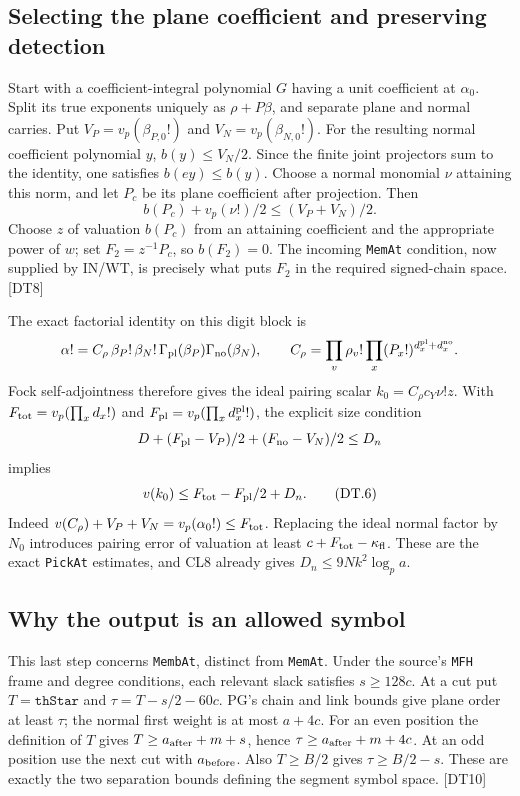 \documentclass[11pt,a4paper]{article}
\numberwithin{equation}{section}
\theoremstyle{remark}\newtheorem{remark}[theorem]{Remark}
\begin{document}
\subsection{Selecting the plane coefficient and preserving detection}

Start with a coefficient-integral polynomial $G$ having a unit coefficient at $\alpha_0$. Split its true exponents uniquely as $\rho+P\beta$, and separate plane and normal carries. Put
$V_P=v_p(\beta_{P,0}!)$ and $V_N=v_p(\beta_{N,0}!)$.
For the resulting normal coefficient polynomial $y$, $b(y)\le V_N/2$.
Since the finite joint projectors sum to the identity, one satisfies $b(ey)\le b(y)$.
Choose a normal monomial $\nu$ attaining this norm, and let $P_c$ be its plane coefficient after projection. Then
\[
 b(P_c)+v_p(\nu!)/2\le(V_P+V_N)/2.
\]
Choose $z$ of valuation $b(P_c)$ from an attaining coefficient and the appropriate power of $w$; set $F_2=z^{-1}P_c$, so $b(F_2)=0$.
The incoming \texttt{MemAt} condition, now supplied by IN/WT, is precisely what puts $F_2$ in the required signed-chain space. \textsf{[DT8]}

The exact factorial identity on this digit block is
\[
 \alpha!=C_\rho\,\beta_P!\,\beta_N!\,
       \Gamma_{\rm pl}(\beta_P)\Gamma_{\rm no}(\beta_N),\qquad
 C_\rho=\prod_v\rho_v!\prod_x(P_x!)^{d_x^{\rm pl}+d_x^{\rm no}}.
\]
Fock self-adjointness therefore gives the ideal pairing scalar
$k_0=C_\rho c_Y\nu!z$. With $F_{\rm tot}=v_p(\prod_xd_x!)$ and
$F_{\rm pl}=v_p(\prod_xd_x^{\rm pl}!)$, the explicit size condition
\[
 D+(F_{\rm pl}-V_P)/2+(F_{\rm no}-V_N)/2\le D_n
\]
implies
\[
 v(k_0)\le F_{\rm tot}-F_{\rm pl}/2+D_n.
 \tag{DT.6}
\]
Indeed $v(C_\rho)+V_P+V_N=v_p(\alpha_0!)\le F_{\rm tot}$. Replacing the ideal normal factor by $N_0$ introduces pairing error of valuation at least $c+F_{\rm tot}-\kappa_{\rm fl}$. These are the exact \texttt{PickAt} estimates, and CL8 already gives $D_n\le9Nk^2\log_p a$.

\subsection{Why the output is an allowed symbol}

This last step concerns \texttt{MembAt}, distinct from \texttt{MemAt}. Under the source's \texttt{MFH} frame and degree conditions, each relevant slack satisfies $s\ge128c$.
At a cut put $T=\texttt{thStar}$ and $\tau=T-s/2-60c$.
PG's chain and link bounds give plane order at least $\tau$; the normal first weight is at most $a+4c$.
For an even position the definition of $T$ gives $T\ge a_{\rm after}+m+s$, hence $\tau\ge a_{\rm after}+m+4c$. At an odd position use the next cut with $a_{\rm before}$. Also $T\ge B/2$ gives $\tau\ge B/2-s$. These are exactly the two separation bounds defining the segment symbol space. \textsf{[DT10]}\cite{test-membership}
\end{document}
